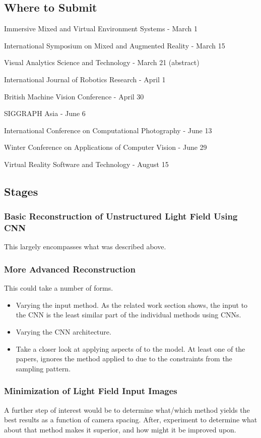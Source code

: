 \documentclass[12pt]{report}
\begin{document}
\subsection*{Where to Submit}

Immersive Mixed and Virtual Environment Systems - March 1

International Symposium on Mixed and Augmented Reality - March 15

Visual Analytics Science and Technology - March 21 (abstract)

International Journal of Robotics Research - April 1

British Machine Vision Conference - April 30

SIGGRAPH Asia - June 6

International Conference on Computational Photography - June 13

Winter Conference on Applications of Computer Vision - June 29

Virtual Reality Software and Technology - August 15


\subsection*{Stages}
\subsubsection*{Basic Reconstruction of Unstructured Light Field Using CNN}

This largely encompasses what was described above.  

\subsubsection*{More Advanced Reconstruction}

This could take a number of forms. 
\begin{itemize}
\item Varying the input method. As the related work section shows, the input to the CNN is the least similar part of the individual methods using CNNs.
\item Varying the CNN architecture.
\item Take a closer look at applying aspects of \cite{Shi14} to the model. At least one of the papers, \cite{Wu17} ignores the method applied to \cite{Shi14} due to the constraints from the sampling pattern. 
\end{itemize}

\subsubsection*{Minimization of Light Field Input Images}
A further step of interest would be to determine what/which method yields the best results as a function of camera spacing. After, experiment to determine what about that method makes it superior, and how might it be improved upon.
\end{document}
